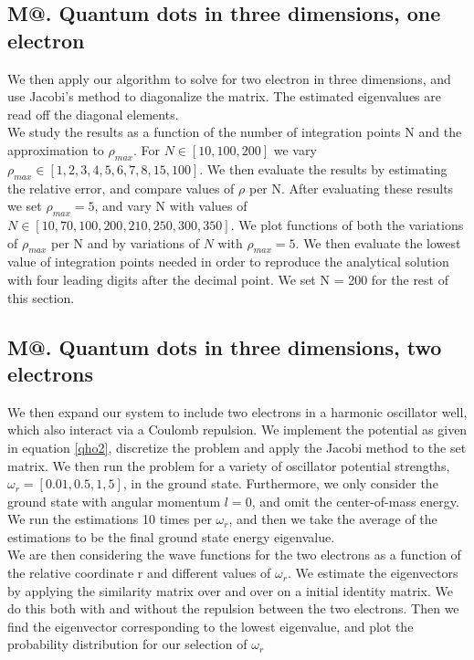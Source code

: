 \documentclass[%
reprint,
amsmath,amssymb,
aps,
]{revtex4-1}
\makeatletter
\newcommand*{\rom}[1]{\expandafter\@slowromancap\romannumeral #1@}
\makeatother
\begin{document}
\subsection*{M\rom{3}. Quantum dots in three dimensions, one electron} \noindent 
We then apply our algorithm to solve for two electron in three dimensions, and use Jacobi's method to diagonalize the matrix. The estimated eigenvalues are read off the diagonal elements. \\ \indent We study the results as a function of the number of integration points N and the approximation to $\rho_{max}$. For $N\in[10,100,200]$ we vary $\rho_{max} \in [1, 2, 3, 4, 5, 6, 7, 8, 15, 100]$. We then evaluate the results by estimating the relative error, and compare values of $\rho$ per N. After evaluating these results we set $\rho_{max} = 5$, and vary N with values of $N\in[10, 70, 100, 200, 210, 250, 300, 350]$. We plot functions of both the variations of $\rho_{max}$ per N and by variations of $N$ with $\rho_{max} = 5$. We then evaluate the lowest value of integration points needed in order to reproduce the analytical solution with four leading digits after the decimal point. We set N = 200 for the rest of this section. 

\subsection*{M\rom{4}. Quantum dots in three dimensions, two electrons} \noindent 
We then expand our system to include two electrons in a harmonic oscillator well, which also interact via a Coulomb repulsion. We implement the potential as given in equation \ref{qho2}, discretize the problem and apply the Jacobi method to the set matrix. We then run the problem for a variety of oscillator potential strengths, $\omega_r = [0.01,0.5,1,5]$, in the ground state. Furthermore, we only consider the ground state with angular momentum $l = 0$, and omit the center-of-mass energy. We run the estimations 10 times per $\omega_r$, and then we take the average of the estimations to be the final ground state energy eigenvalue.\\ \indent 
We are then considering the wave functions for the two electrons as a function of the relative coordinate r and different values of $\omega_r$. We estimate the eigenvectors by applying the similarity matrix over and over on a initial identity matrix. We do this both with and without the repulsion between the two electrons. Then we find the eigenvector corresponding to the lowest eigenvalue, and plot the probability distribution for our selection of $\omega_r$ 
\end{document}

